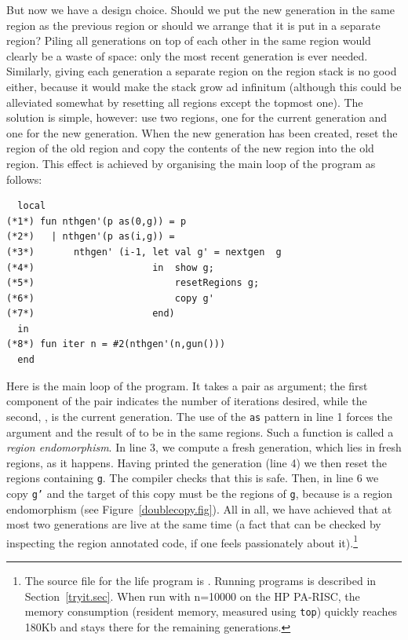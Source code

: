 \documentclass[12pt]{book}
\begin{document}
But now we have a design choice. Should we put the new generation in
the same region as the previous region or should we arrange that it is
put in a separate region? Piling all generations on top of each
other in the same region
would clearly be a waste of space: only the most recent generation is
ever needed. Similarly, giving each generation a separate region on the
region stack is no good either, because it would make the stack grow
ad infinitum (although this could be alleviated somewhat by resetting
all regions except the topmost one). The solution is simple, however:
use two regions, one for the current generation and one for the new
generation. When the new generation has been created, reset the region
of the old region and copy the contents of 
the new region into the old region. This effect is
achieved by organising the main loop of the program as follows:
\begin{verbatim}
  local 
(*1*) fun nthgen'(p as(0,g)) = p 
(*2*)   | nthgen'(p as(i,g)) = 
(*3*)       nthgen' (i-1, let val g' = nextgen  g
(*4*)                     in  show g;
(*5*)                         resetRegions g;
(*6*)                         copy g'
(*7*)                     end)
  in 
(*8*) fun iter n = #2(nthgen'(n,gun()))
  end
\end{verbatim}
Here  is the main loop of
the program. It takes a pair as argument; the first component of the
pair indicates the number of iterations desired, while the second,
, is the current generation. The use of the {\tt as} pattern
in line 1 forces the argument and the result of  to be
in the same regions. Such a function is called a 
%
{\em region endomorphism}. In line 3, we compute a fresh generation,
which lies in fresh regions, as it happens. Having printed the
generation (line 4) we then reset the regions containing {\tt g}. The
compiler checks that this is safe. Then, in line 6 we copy {\tt g'}
and the target of this copy must be the regions of {\tt g}, because
 is a region endomorphism (see
Figure~\ref{doublecopy.fig}).  All in all, we have achieved that at
most two generations are live at the same time (a fact that can be
checked by inspecting the region annotated code, if one feels
passionately about it).\footnote{The source file for the life program
  is . Running programs
  is described in Section~\ref{tryit.sec}. When run with n=10000 on
  the HP PA-RISC, the memory consumption (resident memory, measured
  using {\tt top}) quickly reaches 180Kb and stays there for the
  remaining generations.}
\end{document}
